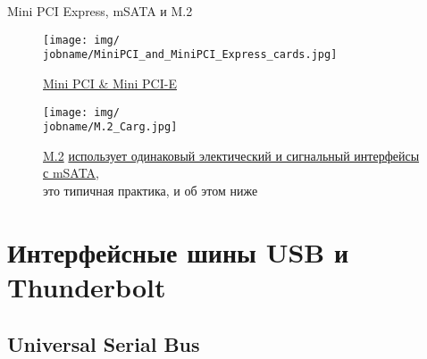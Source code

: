 \documentclass[xetex,aspectratio=43]{beamer}
\begin{document}
\begin{frame}{Mini PCI Express, mSATA и M.2}
    \begin{figure}
        \texttt{[image: img/\\jobname/MiniPCI\_and\_MiniPCI\_Express\_cards.jpg]}
        \caption{\href{https://en.wikipedia.org/wiki/PCI_Express\#MINI-CARD}{Mini PCI \& Mini PCI-E}}
    \end{figure}
    \begin{figure}
        \texttt{[image: img/\\jobname/M.2\_Carg.jpg]}
        \caption{\href{https://en.wikipedia.org/wiki/M.2\#Form_factors_and_keying}{M.2}
        \href{https://en.wikipedia.org/wiki/M.2\#/media/File:SATA_Express_interface.svg}{использует одинаковый электический и сигнальный интерфейсы с mSATA},\\это типичная практика, и об этом ниже
        }
    \end{figure}
\end{frame}

\section{Интерфейсные шины USB и Thunderbolt}

\subsection{Universal Serial Bus}
\end{document}
